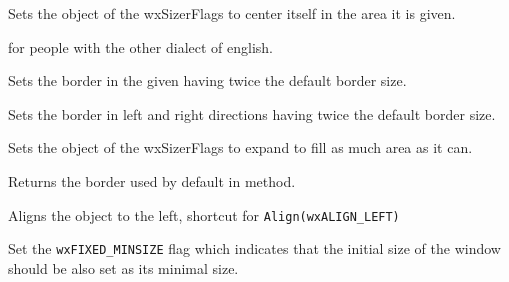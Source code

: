Sets the object of the wxSizerFlags to center itself in the area it is given.


\label{wxsizerflagscentre}


 for people with the other dialect of english.


\label{wxsizerflagsdoubleborder}


Sets the border in the given  having twice the default border
size.


\label{wxsizerflagsdoublehorzborder}


Sets the border in left and right directions having twice the default border
size.


\label{wxsizerflagsexpand}


Sets the object of the wxSizerFlags to expand to fill as much area as it can.


\label{wxsizerflagsgetdefaultborder}


Returns the border used by default in  method.


\label{wxsizerflagsleft}


Aligns the object to the left, shortcut for \texttt{Align(wxALIGN\_LEFT)}




\label{wxsizerflagsfixedminsize}


Set the \texttt{wxFIXED\_MINSIZE} flag which indicates that the initial size of
the window should be also set as its minimal size.


\label{wxsizerflagsproportion}

